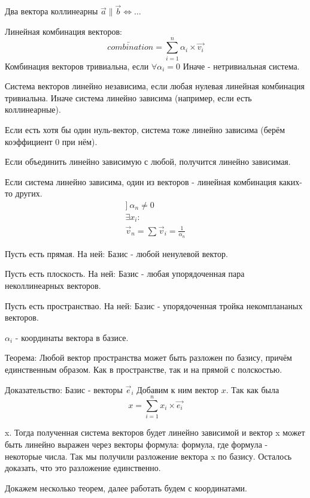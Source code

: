 \documentclass[12pt, a4paper]{article}
\begin{document}
    Два вектора коллинеарны $\vec{a} \parallel \vec{b} \Longleftrightarrow \ldots$

    Линейная комбинация векторов:
    \begin{equation}
        \overleftarrow{combination} = \sum_{i = 1}^{n} {\alpha_i \times \vec{v_i}}
    \end{equation}
    Комбинация векторов тривиальна, если $\forall \alpha_i = 0$
    Иначе - нетривиальная система.

    Система векторов линейно независима, если любая нулевая линейная комбинация тривиальна.
    Иначе система линейно зависима (например, если есть коллинеарные).

    Если есть хотя бы один нуль-вектор, система тоже линейно зависима (берём коэффициент 0 при нём). 

    Если объединить линейно зависимую с любой, получится линейно зависимая.

    Если система линейно зависима, один из векторов - линейная комбинация каких-то других.
    \begin{gather}
        ]~ \alpha_n \neq 0 \\
        \exists x_i:  \\
        \vec{v}_n = \sum_{}^{} \vec{v}_i = \frac{1}{\alpha_n}
    \end{gather}

    Пусть есть прямая. На ней:
    Базис - любой ненулевой вектор.

    Пусть есть плоскость. На ней:
    Базис - любая упорядоченная пара неколлинеарных векторов.

    Пусть есть пространствао. На ней:
    Базис - упорядоченная тройка некомплананых векторов.

    $\alpha_i$ - координаты вектора в базисе.

    Теорема: 
    Любой вектор пространства может быть разложен по базису, причём единственным образом. 
    Как в пространстве, так и на прямой с полскостью.

    Доказательство:
    Базис - векторы $\vec{e}_i$
    Добавим к ним вектор $x$. Так как была 
    \[
        x = \sum_{i = 1}^{n} x_i \times \vec{e_i}
    \]

    x. Тогда полученная система векторов будет линейно зависимой и вектор x может быть линейно выражен через векторы формула: формула, где формула - некоторые числа. Так мы получили разложение вектора x по базису. Осталось доказать, что это разложение единственно. 

    Докажем несколько теорем, далее работать будем с координатами.
\end{document}
